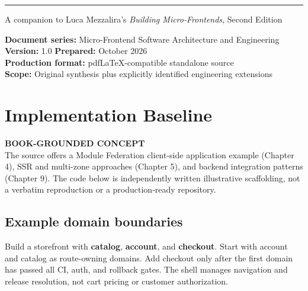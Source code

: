 \documentclass[11pt,letterpaper,oneside]{report}
\newcommand{\based}[1]{\begin{sourcebox}\textbf{BOOK-GROUNDED CONCEPT}\\#1\end{sourcebox}}
\newcommand{\term}[1]{\textbf{\color{navy}#1}}
\begin{document}
\hypersetup{pageanchor=false}%
\begin{titlepage}\thispagestyle{empty}
\vspace{27pt}\noindent\color{blue}\rule{0.75\textwidth}{1.4pt}
\vspace{23pt}\par{\large\sffamily A companion to Luca Mezzalira's \emph{Building Micro-Frontends}, Second Edition}\par
\vfill\noindent\textbf{Document series:} Micro-Frontend Software Architecture and Engineering\\
\textbf{Version:} 1.0 \quad \textbf{Prepared:} October 2026\\
\textbf{Production format:} pdfLaTeX-compatible standalone source\\
\textbf{Scope:} Original synthesis plus explicitly identified engineering extensions
\end{titlepage}\hypersetup{pageanchor=true}
\tableofcontents\clearpage{}

\chapter{Implementation Baseline}
\based{The source offers a Module Federation client-side application example (Chapter 4), SSR and multi-zone approaches (Chapter 5), and backend integration patterns (Chapter 9). The code below is independently written illustrative scaffolding, not a verbatim reproduction or a production-ready repository.}
\section{Example domain boundaries}
Build a storefront with \term{catalog}, \term{account}, and \term{checkout}. Start with account and catalog as route-owning domains. Add checkout only after the first domain has passed all CI, auth, and rollback gates. The shell manages navigation and release resolution, not cart pricing or customer authorization.
\end{document}
